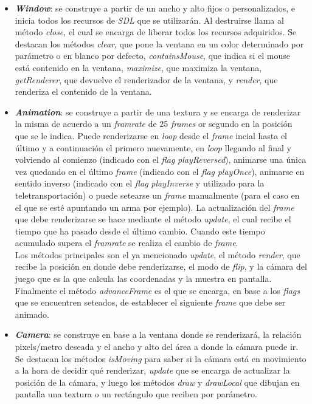 \begin{itemize}
	\item \textbf{\textit{Window}}: se construye a partir de un ancho y alto fijos o personalizados, e inicia todos los recursos de \textit{SDL} que se utilizarán. Al destruirse llama al método \textit{close}, el cual se encarga de liberar todos los recursos adquiridos. Se destacan los métodos \textit{clear}, que pone la ventana en un color determinado por parámetro o en blanco por defecto, \textit{containsMouse}, que indica si el mouse está contenido en la ventana, \textit{maximize}, que maximiza la ventana, \textit{getRenderer}, que devuelve el renderizador de la ventana, y \textit{render}, que renderiza el contenido de la ventana.

	\item \textbf{\textit{Animation}}: se construye a partir de una textura y se encarga de renderizar la misma de acuerdo a un \textit{framrate} de 25 \textit{frames} or segundo en la posición que se le indica. Puede renderizarse en \textit{loop} desde el \textit{frame} incial hasta el último y a continuación el primero nuevamente, en \textit{loop} llegando al final y volviendo al comienzo (indicado con el \textit{flag} \textit{playReversed}), animarse una única vez quedando en el último \textit{frame} (indicado con el \textit{flag} \textit{playOnce}), animarse en sentido inverso (indicado con el \textit{flag} \textit{playInverse} y utilizado para la teletransportación) o puede setearse un \textit{frame} manualmente (para el caso en el que se esté apuntando un arma por ejemplo). La actualización del \textit{frame} que debe renderizarse se hace mediante el método \textit{update}, el cual recibe el tiempo que ha pasado desde el último cambio. Cuando este tiempo acumulado supera el \textit{framrate} se realiza el cambio de \textit{frame}.\\
	\indent Los métodos principales son el ya mencionado \textit{update}, el método \textit{render}, que recibe la posición en donde debe renderizarse, el modo de \textit{flip}, y la cámara del juego que es la que calcula las coordenadas y la muestra en pantalla. Finalmente el método \textit{advanceFrame} es el que se encarga, en base a los \textit{flags} que se encuentren seteados, de establecer el siguiente \textit{frame} que debe ser animado.

	\item \textbf{\textit{Camera}}: se construye en base a la ventana donde se renderizará, la relación pixels/metro deseada  y el ancho y alto del área a donde la cámara puede ir. Se destacan los métodos \textit{isMoving} para saber si la cámara está en movimiento a la hora de decidir qué renderizar, \textit{update} que se encarga de actualizar la posición de la cámara, y luego los métodos \textit{draw} y \textit{drawLocal} que dibujan en pantalla una textura o un rectángulo que reciben por parámetro.


\end{itemize}
